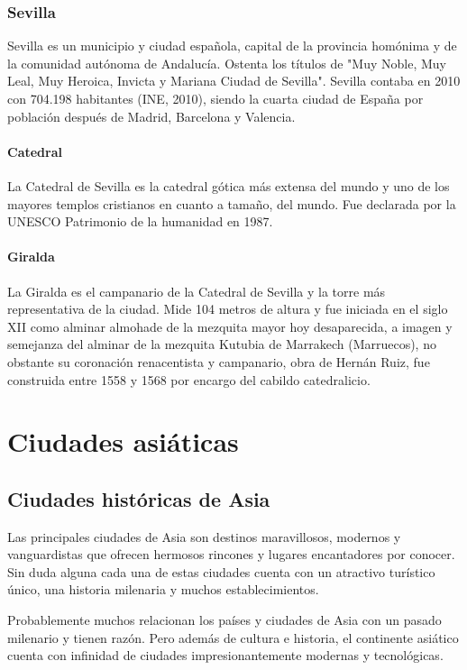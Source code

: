 \documentclass[letterpaper, 11 pt,oneside]{book}
\begin{document}
        \section{Sevilla}
        Sevilla es un municipio y ciudad española, capital de la provincia homónima y de la comunidad autónoma de Andalucía. Ostenta los títulos de "Muy Noble, Muy Leal, Muy Heroica, Invicta y Mariana Ciudad de Sevilla". Sevilla contaba en 2010 con 704.198 habitantes (INE, 2010), siendo la cuarta    ciudad de España por población después de Madrid, Barcelona y Valencia.

	        \subsection*{Catedral}
            La Catedral de Sevilla es la catedral gótica más extensa del mundo y uno de los mayores templos cristianos en cuanto a tamaño, del mundo. Fue declarada por la UNESCO Patrimonio de la humanidad en 1987.
 
            \subsection*{Giralda}
            La Giralda es el campanario de la Catedral de Sevilla y la torre más representativa de la ciudad. Mide 104 metros de altura y fue iniciada en el siglo XII como alminar almohade de la mezquita mayor hoy desaparecida, a imagen y semejanza del alminar de la mezquita Kutubia de Marrakech (Marruecos), no obstante su coronación renacentista y campanario, obra de Hernán Ruiz, fue construida entre 1558 y 1568 por encargo del cabildo catedralicio.
\part{Ciudades asiáticas}
 	\chapter{Ciudades históricas de Asia}
 	Las principales ciudades de Asia son destinos maravillosos, modernos y vanguardistas que ofrecen hermosos rincones y lugares encantadores por conocer. Sin duda alguna cada una de estas ciudades cuenta con un atractivo turístico único, una historia milenaria y muchos establecimientos.
 	
 	Probablemente muchos relacionan los países y ciudades de Asia con un pasado milenario y tienen razón. Pero además de cultura e historia, el continente asiático cuenta con infinidad de ciudades impresionantemente modernas y tecnológicas.
 	
\end{document}
